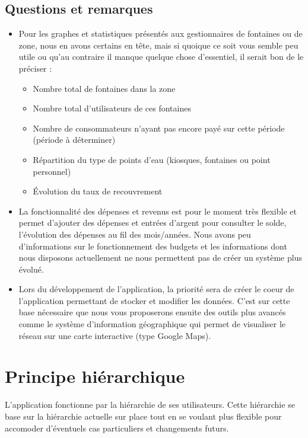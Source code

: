 \documentclass[a4paper, 11pt]{article}
\begin{document}
  \subsection{Questions et remarques}
  \begin{itemize}
    \item Pour les graphes et statistiques présentés aux gestionnaires de fontaines ou de zone, nous en avons certains en tête, mais si quoique ce soit vous semble peu utile ou qu'au contraire il manque quelque chose d'essentiel, il serait bon de le préciser :
    \begin{itemize}
      \item Nombre total de fontaines dans la zone
      \item Nombre total d'utilisateurs de ces fontaines
      \item Nombre de consommateurs n'ayant pas encore payé sur cette période (période à déterminer)
      \item Répartition du type de points d'eau (kiosques, fontaines ou point personnel)
      \item Évolution du taux de recouvrement
    \end{itemize}
    \item La fonctionnalité des dépenses et revenus est pour le moment très flexible et permet d'ajouter des dépenses et entrées d'argent pour consulter le solde, l'évolution des dépenses au fil des mois/années. Nous avons peu d'informations sur le fonctionnement des budgets et les informations dont nous disposons actuellement ne nous permettent pas de créer un système plus évolué.
    \item Lors du développement de l'application, la priorité sera de créer le coeur de l'application permettant de stocker et modifier les données. C'est sur cette base nécessaire que nous vous proposerons ensuite des outils plus avancés comme le système d'information géographique qui permet de visualiser le réseau sur une carte interactive (type Google Maps).
  \end{itemize}

\section{Principe hiérarchique}
  L'application fonctionne par la hiérarchie de ses utilisateurs. Cette hiérarchie se base sur la hiérarchie actuelle sur place tout en se voulant plus flexible pour accomoder d'éventuels cas particuliers et changements futurs.
\end{document}
